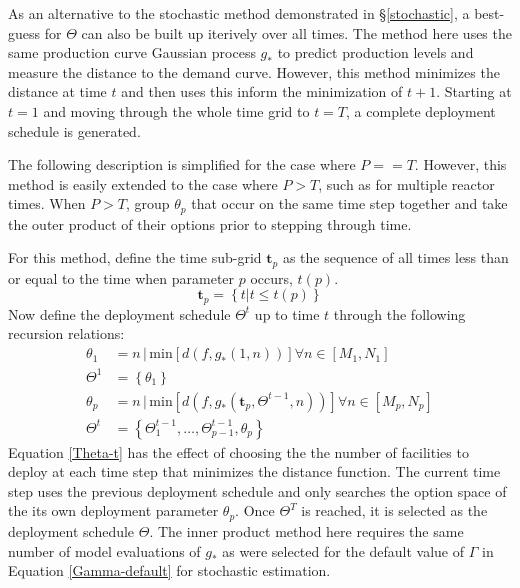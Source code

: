 As an alternative to the stochastic method demonstrated in \S\ref{stochastic}, 
a best-guess for $\Theta$ can also be built up iterively over all times.
The method here uses the same production curve Gaussian process $g_*$ to 
predict production levels and measure the distance to the demand curve.
However, this method minimizes the distance at time
$t$ and then uses this inform the minimization of $t+1$. Starting at $t=1$
and moving through the whole time grid to $t=T$, a complete deployment 
schedule is generated.

The following description is simplified for the case where $P==T$. However, 
this method is easily extended to the case where $P > T$, such as for 
multiple reactor times.  When $P > T$, group $\theta_p$ that occur on the 
same time step together and take the outer product of their options prior to
stepping through time.

For this method, define the time sub-grid $\mathbf{t}_p$ as the sequence of
all times less than or equal to the time when parameter $p$ occurs, $t(p)$.
\begin{equation}
\label{t-p}
\mathbf{t}_p = \left\{t | t \le t(p)\right\}
\end{equation}
Now define the deployment schedule $\Theta^t$ up to time $t$ through the
following recursion relations:
\begin{equation}
\label{Theta-t}
\begin{split}
\theta_1 & = n \, | \, \mathrm{min}\left[d(f, g_*(1, n))\right]
                       \forall n\in[M_1, N_1] \\
\Theta^1 & = \left\{\theta_1\right\}\\
\theta_p & = n \, | \, \mathrm{min}\left[d(f, g_*(\mathbf{t}_p, 
                                                  \Theta^{t-1}, n))\right]
                       \forall n\in[M_p, N_p] \\
\Theta^t & = \left\{\Theta_1^{t-1}, \ldots, \Theta_{p-1}^{t-1}, \theta_p\right\}
\end{split}
\end{equation}
Equation \ref{Theta-t} has the effect of choosing the the number of 
facilities to deploy at each time step that minimizes the distance function.
The current time step uses the previous deployment schedule and only searches
the option space of the its own deployment parameter $\theta_p$. 
Once $\Theta^T$ is 
reached, it is selected as the deployment schedule $\Theta$. The inner 
product method here requires the same number of model evaluations of $g_*$ as 
were selected for the default value of $\Gamma$ in Equation 
\ref{Gamma-default} for stochastic estimation.



